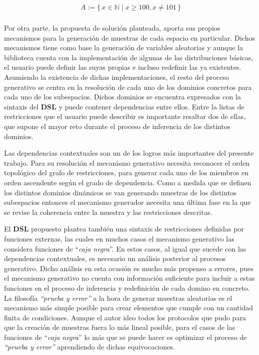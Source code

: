 \newcommand\Set[2]{\{\,#1\mid#2\,\}}
\newcommand\SET[2]{\Set{#1}{\text{#2}}}

\begin{align*}
    A := \Set{x \in \mathbb{N}}{x \ge 100, x \neq 101} \\
\end{align*}

Por otra parte, la propuesta de solución planteada, aporta sus propios mecanismos para la
generación de muestras de cada espacio en particular. Dichos mecanismos tiene como base la
generación de variables aleatorias y aunque la biblioteca cuenta con la implementación de
algunas de las distribuciones básicas, el usuario puede definir las suyas propias e incluso
redefinir las ya existentes. Asumiendo la existencia de dichas implementaciones, el resto del
proceso generativo se centra en la resolución de cada uno de los dominios concretos para cada
uno de los subespacios. Dichos dominios se encuentra expresados con la sintaxis del {\bf DSL}
y puede contener dependencias entre ellos. Entre la listas de restricciones que el usuario puede
describir es importante resaltar dos de ellas, que supone el mayor reto durante el proceso de
inferencia de los distintos dominios.

Las dependencias contextuales son un de los logros más importantes del presente trabajo. Para
su resolución el mecanismo generativo necesita reconocer el orden topológico del grafo de
restricciones, para generar cada uno de los miembros en orden ascendente según el grado de
dependencia. Como a medida que se definen los distintos dominios dinámicos se van generando
muestras de los distintos subespacios entonces el mecanismo generador necesita una última fase
en la que se revise la coherencia entre la muestra y las restricciones descritas.

El {\bf DSL} propuesto plantea también una sintaxis de restricciones definidas por funciones
externas, las cuales en muchos casos el mecanismo generativo las considera funciones
de ``{\it caja negra}''. En estos casos, al igual que sucede con las dependencias contextuales, es
necesario un análisis posterior al procesos generativo. Dicho análisis en esta ocasión es
mucho más propenso a errores, pues el mecanismo generativo no cuenta con información suficiente
para incluir a estas funciones en el proceso de inferencia y redefinición de cada domino en
concreto. La filosofía {\it “prueba y error”} a la hora de generar muestras aleatorias es el
mecanismo más simple posible para crear elementos que cumple con un cantidad finita de condiciones.
Aunque el autor ideo todos los protocolos que pudo para que la creación de muestras fuera lo más
lineal posible, para el casos de las funciones de ``{\it caja negra}'' lo más que se puede hacer es
optimizar el proceso de {\it “prueba y error”} aprendiendo de dichas equivocaciones.


